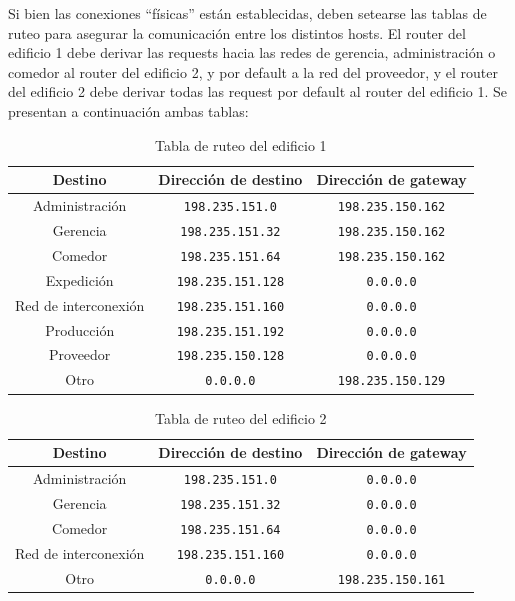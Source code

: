  Si bien las conexiones \enquote{físicas} están establecidas, deben setearse las tablas de ruteo para asegurar la comunicación entre los distintos hosts. El router del edificio 1 debe derivar las requests hacia las redes de gerencia, administración o comedor al router del edificio 2, y por default a la red del proveedor, y el router del edificio 2 debe derivar todas las request por default al router del edificio 1. Se presentan a continuación ambas tablas:\\

\begin{table}[H]
    \centering
    \begin{tabular}{c|c|c}
        \textbf{Destino} & \textbf{Dirección de destino} & \textbf{Dirección de gateway} \\
        \hline
        \small Administración & \small\texttt{198.235.151.0} & \small\texttt{198.235.150.162} \\ 
        \small Gerencia & \small\texttt{198.235.151.32} & \small\texttt{198.235.150.162} \\ 
        \small Comedor & \small\texttt{198.235.151.64} & \small\texttt{198.235.150.162} \\
        \small Expedición & \small\texttt{198.235.151.128} & \small\texttt{0.0.0.0} \\
        \small Red de interconexión & \small\texttt{198.235.151.160} & \small\texttt{0.0.0.0} \\
        \small Producción & \small\texttt{198.235.151.192} & \small\texttt{0.0.0.0} \\
        \small Proveedor & \small\texttt{198.235.150.128} & \small\texttt{0.0.0.0} \\
        \small Otro & \small\texttt{0.0.0.0} & \small\texttt{198.235.150.129} \\  
    \end{tabular}
    \caption{Tabla de ruteo del edificio 1\\}
    \label{tabla_edif1}
\end{table}

\begin{table}[H]
    \centering
    \begin{tabular}{c|c|c}
        \textbf{Destino} & \textbf{Dirección de destino} & \textbf{Dirección de gateway} \\
        \hline 
        \small Administración & \small\texttt{198.235.151.0} & \small\texttt{0.0.0.0} \\ 
        \small Gerencia & \small\texttt{198.235.151.32} & \small\texttt{0.0.0.0} \\ 
        \small Comedor & \small\texttt{198.235.151.64} & \small\texttt{0.0.0.0} \\  
        \small Red de interconexión & \small\texttt{198.235.151.160} & \small\texttt{0.0.0.0} \\
        \small Otro & \small\texttt{0.0.0.0} & \small\texttt{198.235.150.161} \\
    \end{tabular}
    \caption{Tabla de ruteo del edificio 2\\}
    \label{tabla_edif2}
\end{table}

